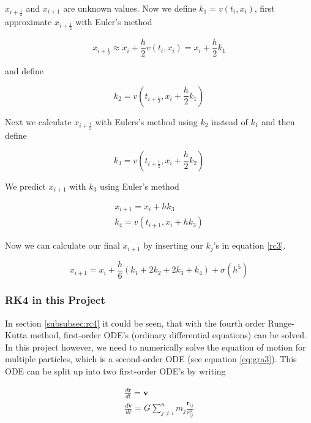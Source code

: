\documentclass[10pt,a4paper]{article}
\begin{document}
$x_{i+\frac{1}{2}}$ and $x_{i+1}$ are unknown values. Now we define $k_1 = v(t_i, x_i)$, first approximate $x_{i+\frac{1}{2}}$ with Euler's method

\begin{equation}
\label{s:rc4}
x_{i+\frac{1}{2}} \approx x_i + \frac{h}{2} v(t_i, x_i) = x_i + \frac{h}{2} k_1
\end{equation}

and define

\begin{equation}
\label{rc5}
k_2 = v(t_{i+\frac{1}{2}}, x_i + \frac{h}{2} k_1)
\end{equation}

Next we calculate $x_{i + \frac{1}{2}}$ with Eulers's method using $k_2$ instead of $k_1$ and then define

\begin{equation}
\label{rc6}
k_3 =  v(t_{i+\frac{1}{2}}, x_i+\frac{h}{2} k_2)
\end{equation}

We predict $x_{i+1}$ with $k_3$ using Euler's method

\begin{align}
x_{i+1} = x_i + h k_3 \\
k_4 = v(t_{i+1}, x_i + h k_3)
\end{align}

Now we can calculate our final $x_{i+1}$ by inserting our $k_j$'s in equation \eqref{rc3}.

\begin{equation}
\label{rc9}
x_{i+1} =  x_i + \frac{h}{6} (k_1 + 2 k_2 + 2 k_3 + k_4) + \sigma(h^5)
\end{equation}

\subsubsection{RK4 in this Project}

In section \ref{subsubsec:rc4} it could be seen, that with the fourth order Runge-Kutta method, first-order ODE's (ordinary differential equations) can be solved. In this project however, we need to numerically solve the equation of motion for multiple particles, which is a second-order ODE (see equation \eqref{eq:gra3}). This ODE can be split up into two first-order ODE's by writing

\begin{align}
\frac{d\mathbf{r}}{dt} = \mathbf{v}  \\
\frac{d\mathbf{v}}{dt} = G \sum_{j \neq i}^{n} m_j \frac{\mathbf{r}_{ij}}{r_{ij}^3}
\end{align}
\end{document}
